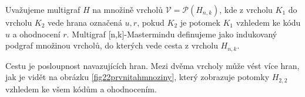 
\begin{definice}
  Uvažujeme multigraf $H$ na množině vrcholů $\mathcal{V} = \mathcal{P}(H_{n,k})$, kde z vrcholu $K_1$ do vrcholu $K_2$ vede hrana označená $u,r$, pokud $K_2$ je potomek $K_1$ vzhledem ke kódu $u$ a ohodnocení $r$. Multigraf [n,k]-Mastermindu definujeme jako indukovaný podgraf množinou vrcholů, do kterých vede cesta z vrcholu $H_{n,k}$. 
  
\end{definice}

\begin{pozn}
    Cestu je posloupnost navazujících hran. Mezi dvěma vrcholy může vést více hran, jak je vidět na obrázku \ref{fig22prvnitahmnoziny}, který zobrazuje potomky $H_{2,2}$ vzhledem ke všem kódům a ohodnocením. 
\end{pozn}

